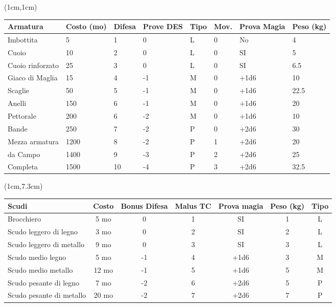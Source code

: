 \documentclass[a4paper,12 pt,openany]{book}
\begin{document}
	\begin{textblock*}{19cm}(1cm,1cm) %

	\begin{tabular}{llllllll}
		\textbf{Armatura} & \textbf{Costo (mo)} & \textbf{Difesa} & \textbf{Prove DES} &  \textbf{Tipo} & \textbf{Mov.} & \textbf{Prova Magia}&\textbf{Peso (kg)}\\
\hline
		Imbottita   & 5    & 1   & 0  &  L   & 0   & No&4\\
		Cuoio   & 10   & 2   & 0   & L   & 0   & SI&5\\
		Cuoio rinforzato   & 25  &3  & 0   &    L   & 0 &SI  & 6.5\\
		Giaco di Maglia   & 15   & 4  & -1  &  M   & 0  &+1d6 & 10\\
		Scaglie& 50   & 5  & -1  &  M   & 0 &+1d6  & 22.5\\
		Anelli & 150  & 6  & -1  &  M   & 0  &+1d6 & 20\\
		Pettorale    & 200  & 6  & -2  &  M  &  0 &+1d6  & 10\\
		Bande   & 250  & 7  & -2  &  P   & 0  &+2d6 & 30\\
		Mezza armatura   & 1200 & 8  & -2  &  P   & 1 &+2d6  & 20\\
		da Campo& 1400 & 9 & -3  &   P   & 2  &+2d6 & 25\\
		Completa& 1500 & 10  & -4  & P   & 3  &+2d6 & 32.5\\
	\end{tabular}
\end{textblock*}

		\begin{textblock*}{19cm}(1cm,7.3cm) %
\begin{tabular}{lcccccc}
	\textbf{Scudi} & \textbf{Costo} & \textbf{Bonus Difesa} & \textbf{Malus TC} & \textbf{Prova magia} & \textbf{Peso (kg)} & \textbf{Tipo}\\
\hline
	Brocchiero& 5 mo  &  0& 1& SI&1  & L\\
	Scudo leggero di legno   & 3 mo  &  0& 2& SI&2  & L\\
	Scudo leggero di metallo & 9  mo  &  0& 3&SI& 3  & L\\
	Scudo medio legno   & 5 mo   &  -1& 4& +1d6&3  & M\\
	Scudo medio metallo & 12 mo  & -1  & 5& +1d6&5  & M\\
	Scudo pesante di legno   & 7  mo  &  -2    & 6& +2d6&5  & P\\
	Scudo pesante di metallo & 20 mo  &  -2    & 7& +2d6&7  & P\\
\end{tabular}
\end{textblock*}
\end{document}
